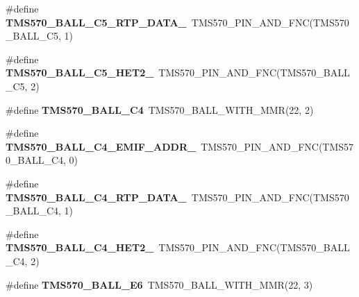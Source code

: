 \begin{DoxyCompactItemize}
\item 
\mbox{\label{tms570ls3137zwt-pins_8h_a885ec0b43a04a072986ee2cb57c57e17}} 
\#define {\bfseries T\+M\+S570\+\_\+\+B\+A\+L\+L\+\_\+\+C5\+\_\+\+R\+T\+P\+\_\+\+D\+A\+T\+A\+\_}~T\+M\+S570\+\_\+\+P\+I\+N\+\_\+\+A\+N\+D\+\_\+\+F\+NC(T\+M\+S570\+\_\+\+B\+A\+L\+L\+\_\+\+C5, 1)
\item 
\mbox{\label{tms570ls3137zwt-pins_8h_aba741bc04f3ea5a1937c7ec48b12e2da}} 
\#define {\bfseries T\+M\+S570\+\_\+\+B\+A\+L\+L\+\_\+\+C5\+\_\+\+H\+E\+T2\+\_}~T\+M\+S570\+\_\+\+P\+I\+N\+\_\+\+A\+N\+D\+\_\+\+F\+NC(T\+M\+S570\+\_\+\+B\+A\+L\+L\+\_\+\+C5, 2)
\item 
\mbox{\label{tms570ls3137zwt-pins_8h_ac2a75caff7eb1c6c1c94f951db52cc2e}} 
\#define {\bfseries T\+M\+S570\+\_\+\+B\+A\+L\+L\+\_\+\+C4}~T\+M\+S570\+\_\+\+B\+A\+L\+L\+\_\+\+W\+I\+T\+H\+\_\+\+M\+MR(22, 2)
\item 
\mbox{\label{tms570ls3137zwt-pins_8h_a6a761e90e66f6ee8475e41a79f33f927}} 
\#define {\bfseries T\+M\+S570\+\_\+\+B\+A\+L\+L\+\_\+\+C4\+\_\+\+E\+M\+I\+F\+\_\+\+A\+D\+D\+R\+\_}~T\+M\+S570\+\_\+\+P\+I\+N\+\_\+\+A\+N\+D\+\_\+\+F\+NC(T\+M\+S570\+\_\+\+B\+A\+L\+L\+\_\+\+C4, 0)
\item 
\mbox{\label{tms570ls3137zwt-pins_8h_a99145a15ff0fb77dddf1f8c991f043f7}} 
\#define {\bfseries T\+M\+S570\+\_\+\+B\+A\+L\+L\+\_\+\+C4\+\_\+\+R\+T\+P\+\_\+\+D\+A\+T\+A\+\_}~T\+M\+S570\+\_\+\+P\+I\+N\+\_\+\+A\+N\+D\+\_\+\+F\+NC(T\+M\+S570\+\_\+\+B\+A\+L\+L\+\_\+\+C4, 1)
\item 
\mbox{\label{tms570ls3137zwt-pins_8h_acee8ce2be8c88d79e964d102f76376a2}} 
\#define {\bfseries T\+M\+S570\+\_\+\+B\+A\+L\+L\+\_\+\+C4\+\_\+\+H\+E\+T2\+\_}~T\+M\+S570\+\_\+\+P\+I\+N\+\_\+\+A\+N\+D\+\_\+\+F\+NC(T\+M\+S570\+\_\+\+B\+A\+L\+L\+\_\+\+C4, 2)
\item 
\mbox{\label{tms570ls3137zwt-pins_8h_a7cf07c9a9e890c88405df04b6ee9b4ca}} 
\#define {\bfseries T\+M\+S570\+\_\+\+B\+A\+L\+L\+\_\+\+E6}~T\+M\+S570\+\_\+\+B\+A\+L\+L\+\_\+\+W\+I\+T\+H\+\_\+\+M\+MR(22, 3)
\item 

\end{DoxyCompactItemize}
